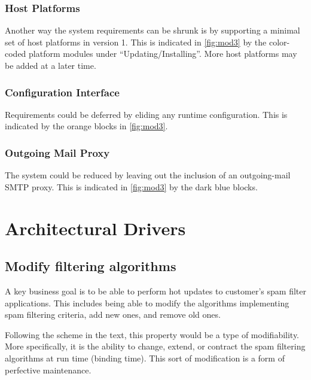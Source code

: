 \documentclass[letterpaper,11pt]{article}
\begin{document}
\subsubsection{Host Platforms}
Another way the system requirements can be shrunk is by supporting a minimal
set of host platforms in version 1.  This is indicated in \autoref{fig:mod3}
by the color-coded platform modules under ``Updating/Installing''.  More host
platforms may be added at a later time.

\subsubsection{Configuration Interface}
Requirements could be deferred by eliding any runtime configuration.  This is
indicated by the orange blocks in \autoref{fig:mod3}.

\subsubsection{Outgoing Mail Proxy}
The system could be reduced by leaving out the inclusion of an outgoing-mail
SMTP proxy.  This is indicated in \autoref{fig:mod3} by the dark blue blocks.


\clearpage
\appendix
\section{Architectural Drivers}

\subsection{Modify filtering algorithms}
\label{app:mod}
A key business goal is to be able to perform hot updates to customer’s spam
filter applications. This includes being able to modify the algorithms
implementing spam filtering criteria, add new ones, and remove old ones.
 
Following the scheme in the text, this property would be a type of
modifiability. More specifically, it is the ability to change, extend, or
contract the spam filtering algorithms at run time (binding time). This sort
of modification is a form of perfective maintenance.
\end{document}
